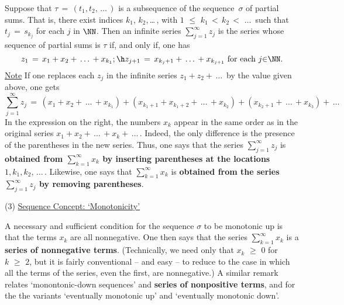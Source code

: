         Suppose that ${\tau} \,=\, (t_{1},t_{2},\,{\ldots}\,)$ is a subsequence of the sequence~${\sigma}$ of partial sums.
    That is, there exist indices $k_{1}$, $k_{2}$,\,{\ldots}\,, with $1\,\,{\leq}\,\,k_{1}\,<\,k_{2}\,<\,\,{\ldots}\,$ such that $t_{j} \,=\, s_{k_{j}}$ for each $j$ in ${\NN}$.
    Then an infinite series $\sum_{j=1}^{{\infty}} z_{j}$ is the series whose sequence of partial sums is ${\tau}$ if, and only if, one has
        \begin{displaymath}
        z_{1} \,=\, x_{1} + x_{2} + \,{\ldots}\,+ x_{k_{1}}; \h
        z_{j+1} \,=\, x_{k_{j} + 1} + \,{\ldots}\,+x_{k_{j+1}} \mbox{ for each $j{\in}{\NN}$}.
        \end{displaymath}
        \underline{Note} If one replaces each $z_{j}$ in the infinite series $z_{1} + z_{2} + \,{\ldots}\,$ by the value given above, one gets
        \begin{displaymath}
        \sum_{j=1}^{{\infty}} z_{j} \,=\, (x_{1} + x_{2} + \,{\ldots}\,+ x_{k_{1}}) + (x_{k_{1}+1} + x_{k_{1} +2} + \,{\ldots}\,+ x_{k_{2}}) +
        (x_{k_{2} + 1} + \,{\ldots}\,+x_{k_{3}}) + \,{\ldots}\,
        \end{displaymath}
    In the expression on the right, the numbers $x_{k}$ appear in the same order as in the original series $x_{1} + x_{2} + \,{\ldots}\, + x_{k} + \,{\ldots}\,$.
    Indeed, the only difference is the presence of the parentheses in the new series.
    Thus, one says that the series $\sum_{j=1}^{{\infty}} z_{j}$ is {\bf obtained from $\sum_{k=1}^{{\infty}} x_{k}$ by inserting parentheses at the locations $1, k_{1}, k_{2},\,{\ldots}\,$}.
    Likewise, one says that $\sum_{k=1}^{{\infty}} x_{k}$ is {\bf obtained from the series $\sum_{j=1}^{{\infty}} z_{j}$ by removing parentheses}.

\V

        (3) \underline{Sequence Concept: `Monotonicity'}

        A necessary and sufficient condition for the sequence ${\sigma}$ to be monotonic up is that the terms $x_{k}$ are all nonnegative.
    One then says that the series $\sum_{k=1}^{{\infty}} x_{k}$ is a {\bf series of nonnegative terms}.
    (Technically, we need only that $x_{k}\,\,{\geq}\,\,0$ for $k\,\,{\geq}\,\,2$, but it is fairly conventional -- and easy -- to reduce to the case in which all the terms of the series, even the first, are nonnegative.)
    A similar remark relates `monontonic-down sequences' and {\bf series of nonpositive terms},
    and for the the variants `eventually monotonic up' and `eventually monotonic down'.

